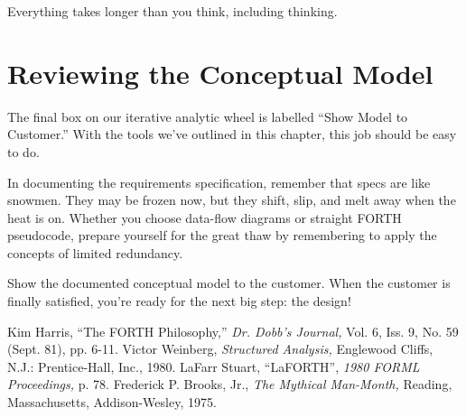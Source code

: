 \begin{tip}
Everything takes longer than you think, including thinking.
\end{tip}

\section{Reviewing the Conceptual Model}

The final box on our iterative analytic wheel is labelled ``Show Model
to Customer.'' With the tools we've outlined in this chapter, this job
should be easy to do.

In documenting the requirements specification, remember that specs are
like snowmen. They may be frozen now, but they shift, slip, and melt
away when the heat is on. Whether you choose data-flow diagrams or
straight FORTH pseudocode, prepare yourself for the great thaw by
remembering to apply the concepts of limited redundancy.

Show the documented conceptual model to the customer. When the
customer is finally satisfied, you're ready for the next big step: the
design!

\begin{references}{9}
 Kim Harris, ``The FORTH Philosophy,''
  \emph{Dr. Dobb's Journal,} Vol. 6, Iss. 9, No. 59 (Sept. 81),
  pp. 6-11.
 Victor Weinberg, \emph{Structured Analysis,}
  Englewood Cliffs, N.J.: Prentice-Hall, Inc., 1980.
 LaFarr Stuart, ``LaFORTH'',
  \emph{1980 FORML Proceedings,} p. 78.
 Frederick P. Brooks, Jr., \emph{The Mythical
  Man-Month,} Reading, Massachusetts, Addison-Wesley, 1975.
\end{references}

